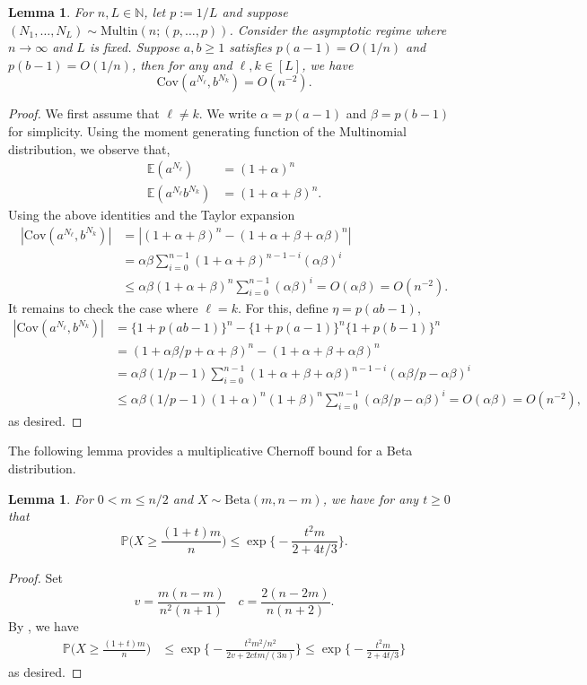 \documentclass[11pt]{article}
\newtheorem{lemma}[thm]{Lemma}
\begin{document}
\begin{lemma}
\label{le: MultinCovariance}
    For $n, L \in\mathbb{N}$, let $p:=1/L$ and suppose $(N_1,\ldots,N_L)\sim \mathrm{Multin}(n; (p,\ldots,p))$. Consider the asymptotic regime where $n\to\infty$ and $L$ is fixed. Suppose $a,b\geq 1$ satisfies $p(a-1) = O(1/n)$ and $p(b-1) = O(1/n)$, then for any and $\ell,k\in[L]$, we have
    \[
    \mathrm{Cov}(a^{N_\ell}, b^{N_k}) = O(n^{-2}).
    \]
\end{lemma}
\begin{proof}
We first assume that $\ell\neq k$. We write $\alpha = p(a-1)$ and $\beta = p(b-1)$ for simplicity.
Using the moment generating function of the Multinomial distribution, we observe that,
\begin{align*}
\mathbb{E}(a^{N_\ell}) &= (1 + \alpha)^n\\
\mathbb{E}(a^{N_\ell}b^{N_k}) &= (1 + \alpha + \beta)^n.
\end{align*}
Using the above identities and the Taylor expansion 
\begin{align*}
    |\mathrm{Cov}(a^{N_\ell}, b^{N_k})| &= |(1 + \alpha + \beta)^n - (1 + \alpha+\beta + \alpha\beta)^n|\\
    &= \alpha\beta\sum_{i=0}^{n-1}(1+\alpha+\beta)^{n-1-i}(\alpha\beta)^i \\
    &\leq \alpha\beta (1+\alpha+\beta)^n \sum_{i=0}^{n-1}(\alpha\beta)^i = O(\alpha\beta) = O(n^{-2}).
\end{align*}
It remains to check the case where $\ell = k$. For this, define $\eta = p(ab-1)$,
\begin{align*}
    |\mathrm{Cov}(a^{N_\ell}, b^{N_k})| &= \{1 + p(ab-1)\}^n -\{1 + p(a-1)\}^n \{1 + p(b-1)\}^n\\
    &=(1+\alpha\beta/p + \alpha + \beta)^n - (1+\alpha+\beta+\alpha\beta)^n\\
    &=\alpha\beta(1/p-1)\sum_{i=0}^{n-1}(1+\alpha+\beta+\alpha\beta)^{n-1-i}(\alpha\beta/p-\alpha\beta)^i\\
    &\leq \alpha\beta(1/p-1)(1+\alpha)^n(1+\beta)^n\sum_{i=0}^{n-1}(\alpha\beta/p-\alpha\beta)^i=O(\alpha\beta) = O(n^{-2}),
\end{align*}
as desired.
\end{proof}

The following lemma provides a multiplicative Chernoff bound for a Beta distribution. 
\begin{lemma}
    \label{Lemma:Beta}
    For $0 < m \leq n/2$ and  $X\sim \mathrm{Beta}(m, n-m)$, we have for any $t \geq 0$ that 
    \[
    \mathbb{P}\biggl(X \geq \frac{(1+t)m}{n} \biggr) \leq \exp\biggl\{ -\frac{t^2m}{2+4t/3}\biggr\}.
    \]
\end{lemma}
\begin{proof}
Set 
\[
v=\frac{m(n-m)}{n^2(n+1)}\quad c=\frac{2(n-2m)}{n(n+2)}.
\]
By \citet[Theorem~1]{skorski2023bernstein}, we have
\begin{align*}
\mathbb{P}\biggl(X \geq \frac{(1+t)m}{n}\biggr) &\leq \exp\biggl\{ -\frac{t^2m^2/n^2}{2v+2ctm/(3n)}\biggr\} \leq \exp\biggl\{ -\frac{t^2m}{2+4t/3}\biggr\}
\end{align*}
as desired.
\end{proof}
\end{document}
